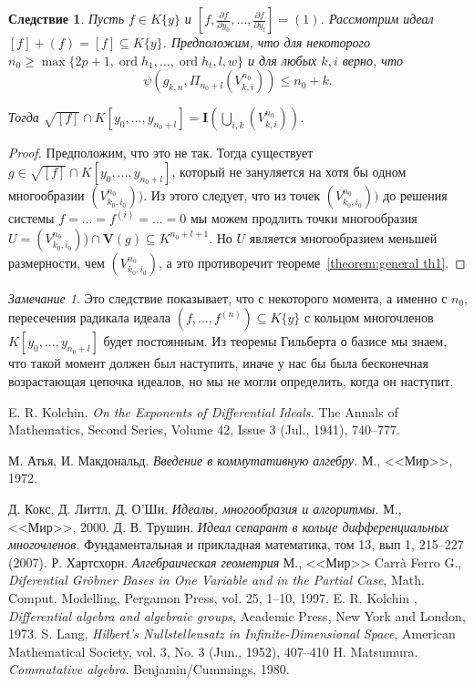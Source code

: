 \documentclass[16pt]{article}
\DeclareMathOperator{\ord}{ord}
\renewcommand{\ge}{\geqslant} %
\theoremstyle{plain1}
\theoremstyle{plain2}
\theoremstyle{plain}
\theoremstyle{plain3}
\newtheorem{corollary}[theorem1]{Следствие}
\theoremstyle{definition}
\theoremstyle{remark}
\newtheorem{remark}[theorem1]{Замечание}
\begin{document}
\begin{corollary}
Пусть $f\in K\{y\}$ и $\left[f,\frac{\partial f}{\partial y_0},\ldots,\frac{\partial f}{\partial y_l}\right]=(1)$. Рассмотрим идеал $[f]+(f)=[f]\subseteq K\{y\}$. Предположим, что для некоторого  $n_0\ge\max\{2p+1,\ord{h_1},\ldots,\ord{h_t},l,w\}$  и для любых $k,i$ верно, что 
$$
\psi(g_{k,n},\Pi_{n_0+l}(V^{n_0}_{k,i}))\leqslant n_0+k.
$$ 

Тогда $\sqrt{[f]}\cap K[y_0,\ldots,y_{n_0+l}]=\mathbf{I}(\bigcup\limits_{i,k}(V^{n_0}_{k,i}))$.
\end{corollary}

\begin{proof}
Предположим, что это не так. Тогда существует $g\in \sqrt{[f]}\cap K[y_0,\ldots,y_{n_0+l}]$, который не зануляется на хотя бы одном многообразии $(V^{n_0}_{k_0,i_0}))$. Из этого следует, что из точек  $(V^{n_0}_{k_0,i_0}))$ до решения системы $f=\ldots=f^{(i)}=\ldots=0$ мы можем продлить точки многообразия $U=(V^{n_0}_{k_0,i_0}))\cap \mathbf{V}(g)\subseteq K^{n_0+l+1}$. Но $U$ является многообразием меньшей размерности, чем $(V^{n_0}_{k_0,i_0})$, а это противоречит теореме~\ref{theorem:general th1}.
\end{proof}
\begin{remark}
Это следствие показывает, что с некоторого момента, а именно с $n_0$,  пересечения  радикала идеала $(f,\ldots,f^{(n)})\subseteq K\{y\}$ с кольцом многочленов $K[y_0,\ldots,y_{n_0+l}]$ будет постоянным. Из теоремы Гильберта о базисе мы знаем,  что такой момент должен был наступить, иначе у нас бы была бесконечная возрастающая цепочка идеалов, но мы не могли определить, когда он наступит.  
\end{remark}

\begin{thebibliography}{99}

E. R. Kolchin.
\emph{On the Exponents of Differential Ideals.}
The Annals of Mathematics, Second Series, Volume 42, Issue 3 (Jul., 1941), 740--777.

М. Атья, И. Макдональд.
\emph{Введение в коммутативную алгебру.} М., <<Мир>>, 1972.

Д. Кокс, Д. Литтл, Д. О'Ши.
\emph{Идеалы, многообразия и алгоритмы.}
М., <<Мир>>, 2000.
Д. В. Трушин.
\emph{Идеал сепарант в кольце дифференциальных многочленов.}
Фундаментальная и прикладная математика, том 13, вып 1, 215--227 (2007).
Р. Хартсхорн.
\emph{Алгебраическая геометрия}
М., <<Мир>>
Carr\`a Ferro G.,
\emph{Diferential Gr\"{o}bner Bases in One Variable and in the Partial Case},
Math. Comput. Modelling, Pergamon Press, vol. 25, 1--10, 1997.
E. R. Kolchin ,
\emph{Differential algebra and algebraic groups}, Academic Press, New York and London, 1973.
S. Lang,
\emph{Hilbert's Nullstellensatz in Infinite-Dimensional Space}, American Mathematical Society, vol. 3, No. 3 (Jun., 1952), 407--410
H. Matsumura.
\emph{Commutative algebra}.
Benjamin/Cummings, 1980.
\end{thebibliography}
\end{document}
